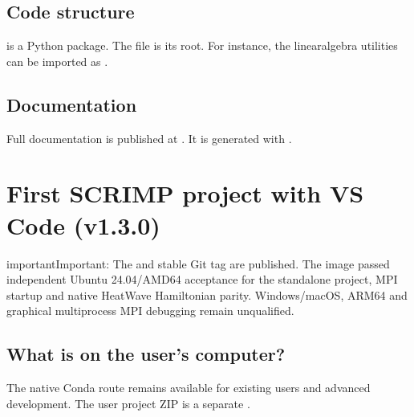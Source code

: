 \documentclass[letterpaper,10pt,english]{sphinxmanual}
\begin{document}
\subsection{Code structure}
\label{\detokenize{install:code-structure}}
\sphinxAtStartPar
{} is a Python package. The  file
is its root. For instance, the linear\sphinxhyphen{}algebra utilities can be
imported as .


\subsection{Documentation}
\label{\detokenize{install:documentation}}
\sphinxAtStartPar
Full documentation is published at
.
It is generated with .

\sphinxstepscope


\section{First SCRIMP project with VS Code (v1.3.0)}
\label{\detokenize{vscode:first-scrimp-project-with-vs-code-v1-3-0}}\label{\detokenize{vscode::doc}}
\begin{sphinxadmonition}{important}{Important:}
\sphinxAtStartPar
The  
and stable Git tag  are published. The image passed
independent Ubuntu 24.04/AMD64 acceptance for the standalone
project, MPI startup and native Heat\textendash{}Wave Hamiltonian parity.
Windows/macOS, ARM64 and graphical multi\sphinxhyphen{}process MPI debugging
remain unqualified.
\end{sphinxadmonition}


\subsection{What is on the user’s computer?}
\label{\detokenize{vscode:what-is-on-the-user-s-computer}}
\sphinxAtStartPar
{} The native Conda route remains available for existing
users and advanced development. The user project ZIP is a
separate .
\end{document}
